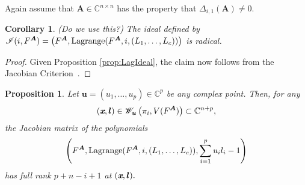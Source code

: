 \documentclass[a4paper]{article}
\def\sI{\mathscr{I}}
\def\mA{{\bm A}}
\def\ub{{\bm u}}
\def\lb{{\bm l}}
\def\xb{\textit{\textbf{x}}}
\DeclareMathOperator{\lag}{Lagrange}
\def\C{\mathbb{C}}
\def\lagFA{{\bm\lag}(F^{\mA},i,(L_1,\hdots,L_c))}
\def\udl{\sum_{i=1}^pu_il_i}
\newtheorem{corollary}[theorem]{Corollary}
\newtheorem{prop}[theorem]{Proposition}
\begin{document}
    Again assume that $\mA \in \C^{n \times n}$ has the property that $\Delta_{i,1}(\mA) \not = 0.$    
    \begin{corollary} (Do we use this?)
     The ideal defined by $\sI(i,F^{\mA}) = \left(F^{\mA},\lagFA\right)$ is radical.
    \end{corollary}
    \begin{proof}
    Given Proposition \ref{prop:LagIdeal}, the claim now follows from the Jacobian Criterion~\cite[Corollary 16.20]{ECA}.
    \end{proof}
    \begin{prop}\label{prop:RadLagPolarV}
     Let $\ub = (u_1,\hdots,u_p) \in \C^p$ be any complex point. Then, for any \[(\xb,\lb)\in \mathscr{W}_{\ub}\left(\pi_i,V(F^{\mA})\right) \subset \C^{n+p},\] the Jacobian matrix of the polynomials
     \[
    \left( F^{\mA},\lagFA,\udl-1\right) 
    \]
 has full rank $p+n-i+1$ at $(\xb,\lb).$ 
    \end{prop}
\end{document}
